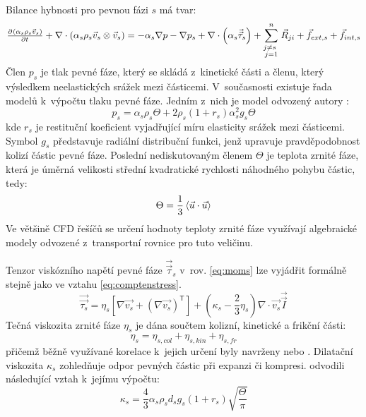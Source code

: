 Bilance hybnosti pro pevnou fázi $s$ má tvar:
\begin{equation}
	\pd{\kula{\alpha_{s}\rho_{s}\vec{v}_{s}}}{t} + \nabla \cdot \kula{\alpha_{s}\rho_{s} \vec{v}_{s} \otimes \vec{v}_{s}} = -\alpha_{s} \nabla p - \nabla p_{s} + \nabla \cdot \left(\alpha_{s} \vec{\vec{\tau}}_{s} \right) +\sum_{\substack{ j \neq s~\\ j=1}}^{n} \vec{R}_{ji} + \vec{f}_{ext,s} + \vec{f}_{int,s}
	\label{eq:moms}
\end{equation}
Člen $p_{s}$ je tlak pevné fáze, který se skládá z~kinetické části a členu, který výsledkem neelastických srážek mezi částicemi. V~současnosti existuje řada modelů k~výpočtu tlaku pevné fáze. Jedním z~nich je model odvozený autory \citet{lun84}:
\begin{equation}
	p_{s} = \alpha_{s}\rho_{s}\Theta + 2\rho_{s}\left(1 + r_{s} \right) \alpha_{s}^{2}g_{s}\Theta
	\label{eq:ps}
\end{equation}
kde $r_{s}$ je restituční koeficient vyjadřující míru elasticity srážek mezi částicemi. Symbol $g_{s}$ představuje radiální distribuční funkci, jenž upravuje pravděpodobnost kolizí částic pevné fáze. Poslední nediskutovaným členem $\Theta$ je teplota zrnité fáze, která je úměrná velikosti střední kvadratické rychlosti náhodného pohybu částic, tedy: 
\begin{equation}
	\Theta = \frac{1}{3} \left<  \vec{u} \cdot \vec{u} \right>
	\label{eq:gtemp}
\end{equation}
Ve většině CFD řešíčů se určení hodnoty teploty zrnité fáze využívají algebraické modely odvozené z~transportní rovnice pro tuto veličinu.

Tenzor viskózního napětí pevné fáze $\vec{\vec{\tau}}_{s}$ v~rov. \ref{eq:moms} lze vyjádřit formálně stejně jako ve vztahu \ref{eq:comptenstress}. 
\begin{equation}
	\vec{\vec{\tau_{s}}} = \eta_{s} \left[ \nabla \vec{v_{s}} +  \left( \nabla \vec{v_{s}} \right)^{\mathsf{T}}\right] +  \left( \kappa_{s} -\frac{2}{3} \eta_{s} \right) \nabla \cdot \vec{v_{s}} \vec{\vec{I}}
	\label{eq:solidstress}
\end{equation}
Tečná viskozita zrnité fáze $\eta_{s}$ je dána součtem kolizní, kinetické a frikční části:
\begin{equation}
	\eta_{s} = \eta_{s,col}  + \eta_{s,kin} + \eta_{s,fr} 
	\label{eq:nys}
\end{equation}
přičemž běžně využívané korelace k~jejich určení byly navrženy \citet{gid92} nebo \citet{syam93}. Dilatační viskozita $\kappa_{s}$ zohledňuje odpor pevných částic při expanzi či kompresi. \citet{lun84} odvodili následující vztah k~jejímu výpočtu:
\begin{equation}
	\kappa_{s} = \frac{4}{3}\alpha_{s}\rho_{s}d_{s}g_{s}\left(1 + r_{s} \right)\sqrt{\frac{\Theta}{\pi}}
	\label{eq:dilvis}
\end{equation}
 
